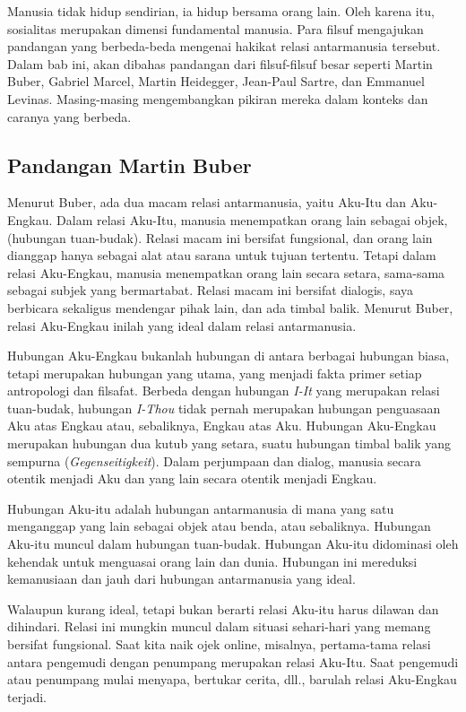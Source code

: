 \documentclass[11pt,twoside,a5paper,openany]{memoir}
\begin{document}
Manusia tidak hidup sendirian, ia hidup bersama orang lain. Oleh karena
itu, sosialitas merupakan dimensi fundamental manusia. Para filsuf
mengajukan pandangan yang berbeda-beda mengenai hakikat relasi
antarmanusia tersebut. Dalam bab ini, akan dibahas pandangan dari
filsuf-filsuf besar seperti Martin Buber, Gabriel Marcel, Martin
Heidegger, Jean-Paul Sartre, dan Emmanuel Levinas. Masing-masing
mengembangkan pikiran mereka dalam konteks dan caranya yang berbeda.

\hypertarget{pandangan-martin-buber}{%
\subsection{Pandangan Martin Buber}\label{pandangan-martin-buber}}

Menurut Buber, ada dua macam relasi antarmanusia, yaitu Aku-Itu dan
Aku-Engkau. Dalam relasi Aku-Itu, manusia menempatkan orang lain sebagai
objek, (hubungan tuan-budak). Relasi macam ini bersifat fungsional, dan
orang lain dianggap hanya sebagai alat atau sarana untuk tujuan
tertentu. Tetapi dalam relasi Aku-Engkau, manusia menempatkan orang lain
secara setara, sama-sama sebagai subjek yang bermartabat. Relasi macam
ini bersifat dialogis, saya berbicara sekaligus mendengar pihak lain,
dan ada timbal balik. Menurut Buber, relasi Aku-Engkau inilah yang ideal
dalam relasi antarmanusia.

Hubungan Aku-Engkau bukanlah hubungan di antara berbagai hubungan biasa,
tetapi merupakan hubungan yang utama, yang menjadi fakta primer setiap
antropologi dan filsafat. Berbeda dengan hubungan \emph{I-It} yang
merupakan relasi tuan-budak, hubungan \emph{I-Thou} tidak pernah
merupakan hubungan penguasaan Aku atas Engkau atau, sebaliknya, Engkau
atas Aku. Hubungan Aku-Engkau merupakan hubungan dua kutub yang setara,
suatu hubungan timbal balik yang sempurna (\emph{Gegenseitigkeit}).
Dalam perjumpaan dan dialog, manusia secara otentik menjadi Aku dan yang
lain secara otentik menjadi Engkau.

Hubungan Aku-itu adalah hubungan antarmanusia di mana yang satu
menganggap yang lain sebagai objek atau benda, atau sebaliknya. Hubungan
Aku-itu muncul dalam hubungan tuan-budak. Hubungan Aku-itu didominasi
oleh kehendak untuk menguasai orang lain dan dunia. Hubungan ini
mereduksi kemanusiaan dan jauh dari hubungan antarmanusia yang ideal.

Walaupun kurang ideal, tetapi bukan berarti relasi Aku-itu harus dilawan
dan dihindari. Relasi ini mungkin muncul dalam situasi sehari-hari yang
memang bersifat fungsional. Saat kita naik ojek online, misalnya,
pertama-tama relasi antara pengemudi dengan penumpang merupakan relasi
Aku-Itu. Saat pengemudi atau penumpang mulai menyapa, bertukar cerita,
dll., barulah relasi Aku-Engkau terjadi.
\end{document}
